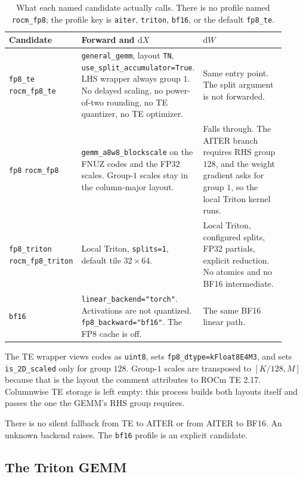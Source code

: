 \documentclass[11pt]{article}
\DeclareRobustCommand{\code}[1]{\texttt{#1}}
\begin{document}
\begin{table}[t]
\centering
\caption{What each named candidate actually calls. There is no profile named
\code{rocm\_fp8}; the profile key is \code{aiter}, \code{triton},
\code{bf16}, or the default \code{fp8\_te}.}
\label{tab:backends}
\small
\begin{tabular}{@{}L{0.22\linewidth}L{0.36\linewidth}L{0.34\linewidth}@{}}
\toprule
Candidate & Forward and \(\mathrm{d}X\) & \(\mathrm{d}W\) \\
\midrule
\code{fp8\_te} \newline \code{rocm\_fp8\_te}
 & \code{general\_gemm}, layout \code{TN}, \code{use\_split\_accumulator=True}. LHS wrapper always group \(1\). No delayed scaling, no power-of-two rounding, no TE quantizer, no TE optimizer.
 & Same entry point. The split argument is not forwarded. \\
\code{fp8} \newline \code{rocm\_fp8}
 & \code{gemm\_a8w8\_blockscale} on the FNUZ codes and the FP32 scales. Group-\(1\) scales stay in the column-major layout.
 & Falls through. The AITER branch requires RHS group \(128\), and the weight gradient asks for group \(1\), so the local Triton kernel runs. \\
\code{fp8\_triton} \newline \code{rocm\_fp8\_triton}
 & Local Triton, \code{splits=1}, default tile \(32\times 64\).
 & Local Triton, configured splits, FP32 partials, explicit reduction. No atomics and no BF16 intermediate. \\
\code{bf16}
 & \code{linear\_backend="torch"}. Activations are not quantized. \code{fp8\_backward="bf16"}. The FP8 cache is off.
 & The same BF16 linear path. \\
\bottomrule
\end{tabular}
\end{table}

The TE wrapper views codes as \code{uint8}, sets
\code{fp8\_dtype=kFloat8E4M3}, and sets \code{is\_2D\_scaled} only for group
\(128\). Group-\(1\) scales are transposed to \([K/128,M]\) because that is
the layout the comment attributes to ROCm TE 2.17. Columnwise TE storage is
left empty: this process builds both layouts itself and passes the one the
GEMM's RHS group requires.

There is no silent fallback from TE to AITER or from AITER to BF16. An
unknown backend raises. The \code{bf16} profile is an explicit candidate.

\subsection{The Triton GEMM}
\end{document}
